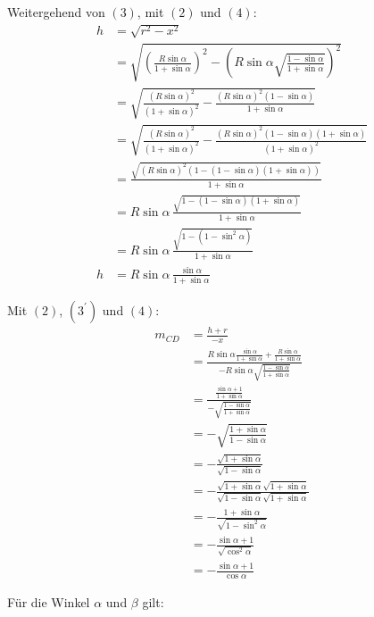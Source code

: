 \documentclass[12pt,a4paper,oneside]{article}
\begin{document}
\begin{samepage}
	Weitergehend von $(3)$, mit $(2)$ und $(4)$: \nopagebreak
	\begin{align*}
		h &= \sqrt{r^2-x^2} \\
		&= \sqrt{\left(\frac{R\sin\alpha}{1+\sin\alpha}\right)^2 - \left(R\sin\alpha\sqrt{\frac{1-\sin\alpha}{1+\sin\alpha}}\right)^2} \\
		&= \sqrt{\frac{(R\sin\alpha)^2}{(1+\sin\alpha)^2} - \frac{(R\sin\alpha)^2(1-\sin\alpha)}{1+\sin\alpha}} \\
		&= \sqrt{\frac{(R\sin\alpha)^2}{(1+\sin\alpha)^2} - \frac{(R\sin\alpha)^2(1-\sin\alpha)(1+\sin\alpha)}{(1+\sin\alpha)^2}} \\
		&= \frac{\sqrt{(R\sin\alpha)^2(1-(1-\sin\alpha)(1+\sin\alpha))}}{1+\sin\alpha} \\
		&= R\sin\alpha \, \frac{\sqrt{1-(1-\sin\alpha)(1+\sin\alpha)}}{1+\sin\alpha} \\
		&= R\sin\alpha \, \frac{\sqrt{1-(1-\sin^2\alpha)}}{1+\sin\alpha} \\
		h &= R\sin\alpha \, \frac{\sin\alpha}{1+\sin\alpha} \tag{$3^\prime$}
	\end{align*}
\end{samepage} \goodbreak

\begin{samepage}
	Mit $(2)$, $(3^\prime)$ und $(4)$: \nopagebreak
	\begin{align*}
		m_{CD} &= \frac{h+r}{-x} \\
		&= \frac{R\sin\alpha \frac{\sin\alpha}{1+\sin\alpha} + \frac{R\sin\alpha}{1+\sin\alpha}}{-R\sin\alpha\sqrt{\frac{1-\sin\alpha}{1+\sin\alpha}}} \\
		&= \frac{\frac{\sin\alpha+1}{1+\sin\alpha}}{-\sqrt{\frac{1-\sin\alpha}{1+\sin\alpha}}} \\
		&= -\sqrt{\frac{1+\sin\alpha}{1-\sin\alpha}} \\
		&= -\frac{\sqrt{1+\sin\alpha}}{\sqrt{1-\sin\alpha}} \\
		&= -\frac{\sqrt{1+\sin\alpha}\sqrt{1+\sin\alpha}}{\sqrt{1-\sin\alpha}\sqrt{1+\sin\alpha}} \\
		&= -\frac{1+\sin\alpha}{\sqrt{1 - \sin^2\alpha}} \\
		&= -\frac{\sin\alpha+1}{\sqrt{\cos^2\alpha}} \\
		&= -\frac{\sin\alpha+1}{\cos\alpha}
	\end{align*}
\end{samepage}

\pagebreak
{}
Für die Winkel $\alpha$ und $\beta$ gilt:
\end{document}
